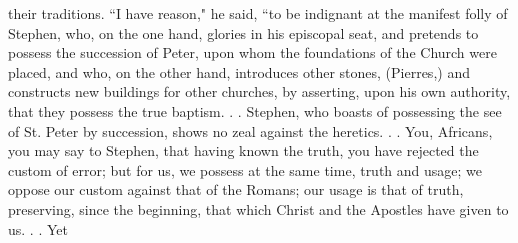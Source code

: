 their traditions. “I have reason," he said, “to be indignant at the manifest folly of Stephen, who, on the one hand, glories in his episcopal seat, and pretends to possess the succession of Peter, upon whom the foundations of the Church were placed, and who, on the other hand, introduces other stones, (Pierres,) and constructs new buildings for other churches, by asserting, upon his own authority, that they possess the true baptism. . . Stephen, who boasts of possessing the see of St. Peter by succession, shows no zeal against the heretics. . . You, Africans, you may say to Stephen, that having known the truth, you have rejected the custom of error; but for us, we possess at the same time, truth and usage; we oppose our custom against that of the Romans; our usage is that of truth, preserving, since the beginning, that which Christ and the Apostles have given to us. . . Yet

